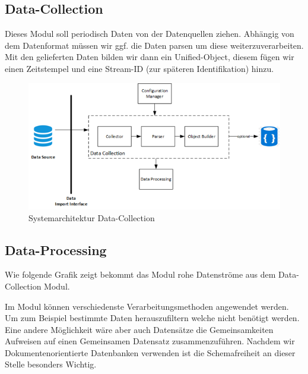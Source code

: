 \subsection{Data-Collection}
Dieses Modul soll periodisch Daten von der Datenquellen ziehen. Abhängig von dem Datenformat müssen wir ggf. die Daten parsen um diese weiterzuverarbeiten. Mit den gelieferten Daten bilden wir dann ein Unified-Object, diesem fügen wir einen Zeitstempel und eine Stream-ID (zur späteren Identifikation) hinzu.
\begin{figure}[H]
    \centering
    \includegraphics[scale=1]{images/archDataCollection.png}
    \caption{Systemarchitektur Data-Collection}
    \label{img:archDataCollection}
\end{figure}
\subsection{Data-Processing}
Wie folgende Grafik zeigt bekommt das Modul rohe Datenströme aus dem Data-Collection Modul.

Im Modul können verschiedenste Verarbeitungsmethoden angewendet werden. Um zum Beispiel bestimmte Daten herauszufiltern welche nicht benötigt werden. Eine andere Möglichkeit wäre aber auch Datensätze die Gemeinsamkeiten Aufweisen auf einen Gemeinsamen Datensatz zusammenzuführen. Nachdem wir Dokumentenorientierte Datenbanken verwenden ist die Schemafreiheit an dieser Stelle besonders Wichtig. 


